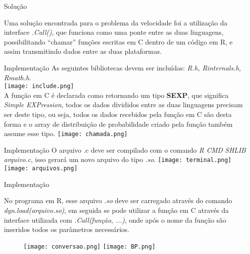 \documentclass{beamer} %
\begin{document}
\begin{frame}{Solução}
    
Uma solução encontrada para o problema da velocidade foi a utilização da interface \textit{.Call()}\cite{Speed}, que funciona como uma ponte entre as duas linguagens, possibilitando “chamar” funções escritas em C dentro de um código em R, e assim transmitindo dados entre as duas plataformas.
    
\end{frame}

\begin{frame}{Implementação}
 As seguintes bibliotecas devem ser incluídas: \textit{R.h, Rinternals.h, Rmath.h}. \\
 \vspace{0.3cm}
 \texttt{[image: include.png]}\\
 
 A função em C é declarada como retornando um tipo \textbf{SEXP}, que significa \textit{Simple EXPression}, todos os dados divididos entre as duas linguagens precisam ser deste tipo, ou seja, todos os dados recebidos pela função em C são desta forma e o array de distribuição de probabilidade criado pela função também assume esse tipo.\cite{.Call,Extensions}
 \vspace{0.3cm}
 \texttt{[image: chamada.png]}\\
     
\end{frame}

\begin{frame}{Implementação}
O arquivo .c deve ser compilado com o comando \textit{R CMD SHLIB arquivo.c}, isso gerará um novo arquivo do tipo \textit{.so}.
\vspace{0.3cm}    
\texttt{[image: terminal.png]}\\
\vspace{0.3cm}
\texttt{[image: arquivos.png]}\\
\vspace{0.3cm}
\end{frame}

\begin{frame}{Implementação}

 No programa em R, esse arquivo \textit{.so} deve ser carregado através do comando \textit{dyn.load(arquivo.so)}, em seguida se pode utilizar a função em C através da interface utilizada com \textit{.Call(função, ...)}, onde após o nome da função são inseridos todos os parâmetros necessários.\\

\begin{figure}[h]
\texttt{[image: conversao.png]}
\texttt{[image: BP.png]}
\end{figure}
\end{frame}
\end{document}
